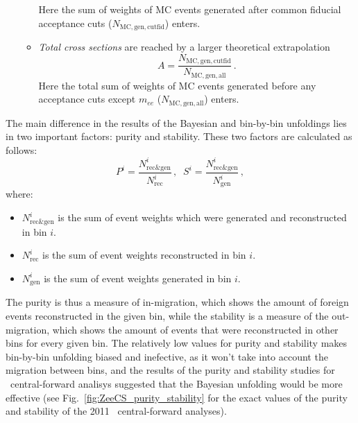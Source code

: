 \begin{itemize}
\begin{itemize}
\begin{equation}
    \end{equation}
    Here the sum of weights of MC events generated after common fiducial acceptance cuts ($N_\mathrm{MC, gen, cutfid}$) enters.
  \item \textit{Total cross sections} are reached by a larger theoretical extrapolation
    \begin{equation}
      A = \frac{N_\mathrm{MC, gen, cutfid}}{N_\mathrm{MC, gen, all}}\,.
    \end{equation}
    Here the total sum of weights of MC events generated before any acceptance cuts except $m_{ee}$ ($N_\mathrm{MC, gen, all}$) enters.
  \end{itemize}
\end{itemize}

The main difference in the results of the Bayesian and bin-by-bin unfoldings lies in two important factors: purity and stability. These two factors are calculated as follows:
\begin{equation}
P^{i} = \frac{N^{i}_{\text{rec\&gen}} }{ N^{i}_{\text{rec}} }\,, \; \;
S^{i} = \frac{N^{i}_{\text{rec\&gen}} }{ N^{i}_{\text{gen}} }\,,
\end{equation}
where:
\begin{itemize}
\item {\bfseries $N^i_{\text{rec\&gen}}$} is the sum of event weights which were generated and reconstructed in bin $i$.
\item {\bfseries $N^i_{\text{rec}}$} is the sum of event weights reconstructed in bin $i$.
\item {\bfseries $N^i_{\text{gen}}$} is the sum of event weights generated in bin $i$.
\end{itemize}

The purity is thus a measure of in-migration, which shows the amount of foreign events reconstructed in the given bin, while the stability is a measure of the out-migration, which shows the amount of events that were reconstructed in other bins for every given bin. The relatively low values for purity and stability makes bin-by-bin unfolding biased and inefective, as it won't take into account the migration between bins, and the results of the purity and stability studies for \Zee\ central-forward analisys suggested that the Bayesian unfolding would be more effective (see Fig.~\ref{fig:ZeeCS_purity_stability} for the exact values of the purity and stability of the 2011 \Zee\ central-forward analyses).

